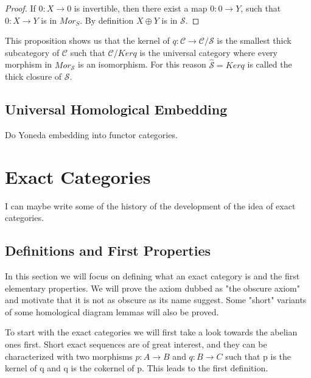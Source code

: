 \documentclass[11pt]{article}
\theoremstyle{definition}
\theoremstyle{remark}
\begin{document}
            \begin{proof}
                If $0:X\rightarrow 0$ is invertible, then there exist a map $0:0\rightarrow Y$, such that $0:X\rightarrow Y$ is in $Mor_S$. By definition $X\oplus Y$ is in $\mathcal{S}$.
            \end{proof}

            This proposition shows us that the kernel of $q:\mathcal{C}\rightarrow\mathcal{C}/\mathcal{S}$ is the smallest thick subcategory of $\mathcal{C}$ such that $\mathcal{C}/Kerq$ is the universal category where every morphism in $Mor_\mathcal{S}$ is an isomorphism. For this reason $\widehat{\mathcal{S}}=Kerq$ is called the thick closure of $\mathcal{S}$.

        \subsection{Universal Homological Embedding}
            Do Yoneda embedding into functor categories.
    
    \clearpage
    
    \section{Exact Categories}
            
        I can maybe write some of the history of the development of the idea of exact categories. 

        \subsection{Definitions and First Properties}

            In this section we will focus on defining what an exact category is and the first elementary properties. We will prove the axiom dubbed as "the obscure axiom" and motivate that it is not as obscure as its name suggest. Some "short" variants of some homological diagram lemmas will also be proved.

            To start with the exact categories we will first take a look towards the abelian ones first. Short exact sequences are of great interest, and they can be characterized with two morphisms $p:A\rightarrow B$ and $q:B\rightarrow C$ such that p is the kernel of q and q is the cokernel of p. This leads to the first definition.
\end{document}
